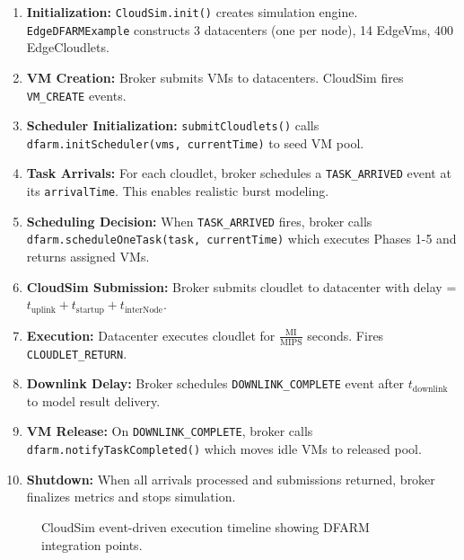\documentclass[12pt]{report}
\begin{document}
\begin{enumerate}
    \item \textbf{Initialization:} \texttt{CloudSim.init()} creates simulation engine. \texttt{EdgeDFARMExample} constructs 3 datacenters (one per node), 14 EdgeVms, 400 EdgeCloudlets.
    
    \item \textbf{VM Creation:} Broker submits VMs to datacenters. CloudSim fires \texttt{VM\_CREATE} events.
    
    \item \textbf{Scheduler Initialization:} \texttt{submitCloudlets()} calls \texttt{dfarm.initScheduler(vms, currentTime)} to seed VM pool.
    
    \item \textbf{Task Arrivals:} For each cloudlet, broker schedules a \texttt{TASK\_ARRIVED} event at its \texttt{arrivalTime}. This enables realistic burst modeling.
    
    \item \textbf{Scheduling Decision:} When \texttt{TASK\_ARRIVED} fires, broker calls \texttt{dfarm.scheduleOneTask(task, currentTime)} which executes Phases 1-5 and returns assigned VMs.
    
    \item \textbf{CloudSim Submission:} Broker submits cloudlet to datacenter with delay = $t_{\text{uplink}} + t_{\text{startup}} + t_{\text{interNode}}$.
    
    \item \textbf{Execution:} Datacenter executes cloudlet for $\frac{\text{MI}}{\text{MIPS}}$ seconds. Fires \texttt{CLOUDLET\_RETURN}.
    
    \item \textbf{Downlink Delay:} Broker schedules \texttt{DOWNLINK\_COMPLETE} event after $t_{\text{downlink}}$ to model result delivery.
    
    \item \textbf{VM Release:} On \texttt{DOWNLINK\_COMPLETE}, broker calls \texttt{dfarm.notifyTaskCompleted()} which moves idle VMs to released pool.
    
    \item \textbf{Shutdown:} When all arrivals processed and submissions returned, broker finalizes metrics and stops simulation.
\end{enumerate}

\begin{figure}[H]
    \centering
    \caption{CloudSim event-driven execution timeline showing DFARM integration points.}
    \label{fig:timeline}
\end{figure}
\end{document}

